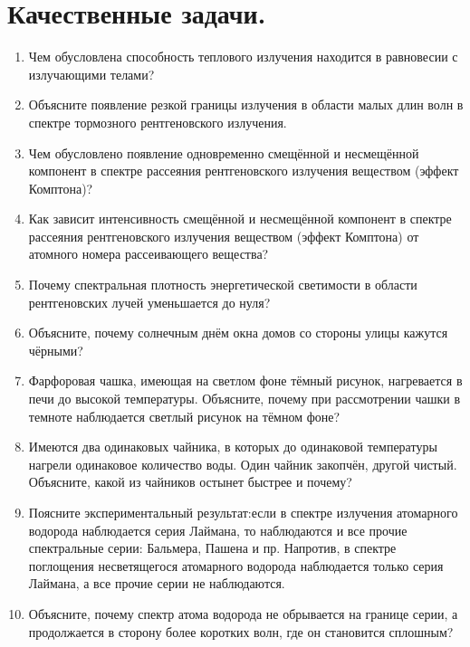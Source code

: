 \section{Качественные задачи.}

\begin{enumerate}
\item Чем обусловлена способность теплового излучения находится в равновесии с
излучающими телами?

\item Объясните появление резкой границы излучения в области малых длин волн в
спектре тормозного рентгеновского излучения.

\item Чем обусловлено появление одновременно смещённой и несмещённой
компонент в спектре рассеяния рентгеновского излучения веществом (эффект
Комптона)?

\item Как зависит интенсивность смещённой и несмещённой компонент в спектре
рассеяния рентгеновского излучения веществом (эффект Комптона) от атомного
номера рассеивающего вещества?

\item Почему спектральная плотность энергетической светимости в области
рентгеновских лучей уменьшается до нуля?

\item Объясните, почему солнечным днём окна домов со стороны улицы кажутся
чёрными?

\item Фарфоровая чашка, имеющая на светлом фоне тёмный рисунок, нагревается в
печи до высокой температуры. Объясните, почему при рассмотрении чашки в
темноте наблюдается светлый рисунок на тёмном фоне?

\item Имеются два одинаковых чайника, в которых до одинаковой температуры
нагрели одинаковое количество воды. Один чайник закопчён, другой чистый.
Объясните, какой из чайников остынет быстрее и почему?

\item Поясните экспериментальный результат:если в спектре излучения атомарного
водорода наблюдается серия Лаймана, то наблюдаются и все прочие спектральные
серии: Бальмера, Пашена и пр. Напротив, в спектре поглощения несветящегося
атомарного водорода наблюдается только серия Лаймана, а все прочие серии не
наблюдаются. 

\item Объясните, почему спектр атома водорода не обрывается на границе серии, а
продолжается в сторону более коротких волн, где он становится сплошным?


\end{enumerate}
